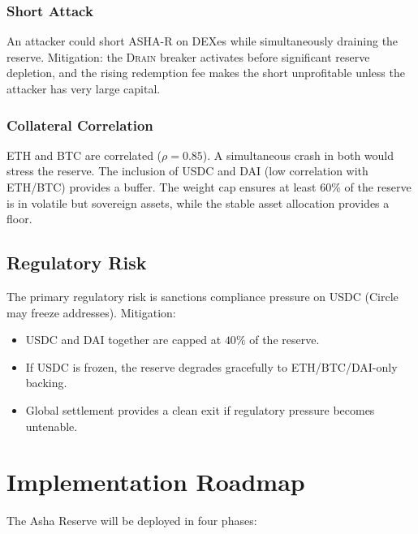\documentclass[11pt,a4paper]{article}
\newcommand{\ashares}{\textsc{ASHA-R}\xspace}
\begin{document}
\subsubsection{Short Attack}

An attacker could short \ashares on DEXes while simultaneously draining the reserve.
Mitigation: the \textsc{Drain} breaker activates before significant reserve depletion, and the rising redemption fee makes the short unprofitable unless the attacker has very large capital.

\subsubsection{Collateral Correlation}

ETH and BTC are correlated ($\rho = 0.85$).
A simultaneous crash in both would stress the reserve.
The inclusion of USDC and DAI (low correlation with ETH/BTC) provides a buffer.
The weight cap ensures at least $60\%$ of the reserve is in volatile but sovereign assets, while the stable asset allocation provides a floor.

\subsection{Regulatory Risk}

The primary regulatory risk is sanctions compliance pressure on USDC (Circle may freeze addresses).
Mitigation:
\begin{itemize}
  \item USDC and DAI together are capped at $40\%$ of the reserve.
  \item If USDC is frozen, the reserve degrades gracefully to ETH/BTC/DAI-only backing.
  \item Global settlement provides a clean exit if regulatory pressure becomes untenable.
\end{itemize}

\section{Implementation Roadmap}
\label{sec:roadmap}

The Asha Reserve will be deployed in four phases:
\end{document}

